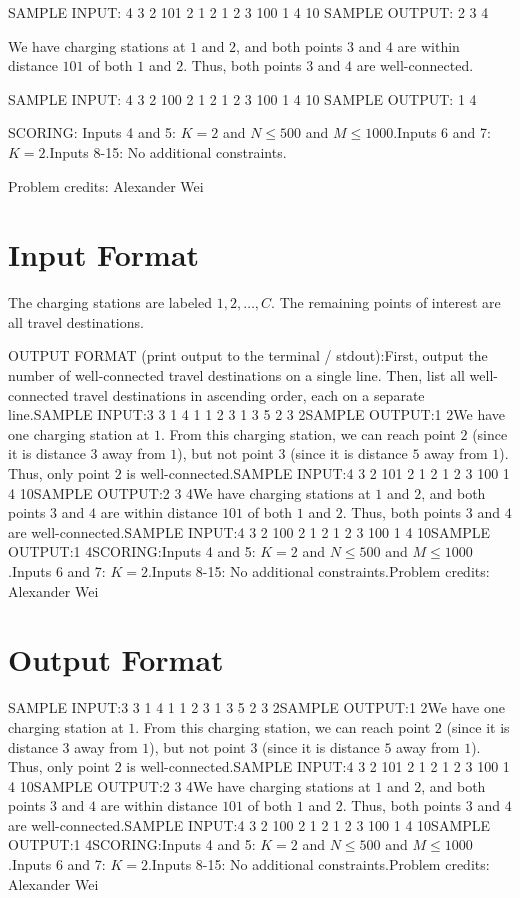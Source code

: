 \documentclass[12pt]{article}
\begin{document}
SAMPLE INPUT:
4 3 2 101 2
1 2 1
2 3 100
1 4 10
SAMPLE OUTPUT: 
2
3
4

We have charging stations at $1$ and $2$, and both points $3$ and $4$ are within
distance $101$ of both $1$ and $2$. Thus, both points $3$ and $4$ are well-connected.

SAMPLE INPUT:
4 3 2 100 2
1 2 1
2 3 100
1 4 10
SAMPLE OUTPUT: 
1
4

SCORING:
Inputs 4 and 5: $K = 2$ and $N \le 500$ and
$M\le 1000$.Inputs 6 and 7: $K = 2$.Inputs 8-15: No additional constraints.


Problem credits: Alexander Wei



\section*{Input Format}
The charging stations are labeled $1, 2, \ldots, C$. The remaining points of
interest are all travel destinations.

OUTPUT FORMAT (print output to the terminal / stdout):First, output the number of well-connected travel destinations on a single line.
Then, list all well-connected travel destinations in ascending order, each on a
separate line.SAMPLE INPUT:3 3 1 4 1
1 2 3
1 3 5
2 3 2SAMPLE OUTPUT:1
2We have one charging station at $1$. From this charging station, we can reach
point $2$ (since it is distance $3$ away from $1$), but not point $3$ (since it
is distance $5$ away from $1$). Thus, only point $2$ is well-connected.SAMPLE INPUT:4 3 2 101 2
1 2 1
2 3 100
1 4 10SAMPLE OUTPUT:2
3
4We have charging stations at $1$ and $2$, and both points $3$ and $4$ are within
distance $101$ of both $1$ and $2$. Thus, both points $3$ and $4$ are well-connected.SAMPLE INPUT:4 3 2 100 2
1 2 1
2 3 100
1 4 10SAMPLE OUTPUT:1
4SCORING:Inputs 4 and 5: $K = 2$ and $N \le 500$ and
$M\le 1000$.Inputs 6 and 7: $K = 2$.Inputs 8-15: No additional constraints.Problem credits: Alexander Wei

\section*{Output Format}
SAMPLE INPUT:3 3 1 4 1
1 2 3
1 3 5
2 3 2SAMPLE OUTPUT:1
2We have one charging station at $1$. From this charging station, we can reach
point $2$ (since it is distance $3$ away from $1$), but not point $3$ (since it
is distance $5$ away from $1$). Thus, only point $2$ is well-connected.SAMPLE INPUT:4 3 2 101 2
1 2 1
2 3 100
1 4 10SAMPLE OUTPUT:2
3
4We have charging stations at $1$ and $2$, and both points $3$ and $4$ are within
distance $101$ of both $1$ and $2$. Thus, both points $3$ and $4$ are well-connected.SAMPLE INPUT:4 3 2 100 2
1 2 1
2 3 100
1 4 10SAMPLE OUTPUT:1
4SCORING:Inputs 4 and 5: $K = 2$ and $N \le 500$ and
$M\le 1000$.Inputs 6 and 7: $K = 2$.Inputs 8-15: No additional constraints.Problem credits: Alexander Wei
\end{document}
